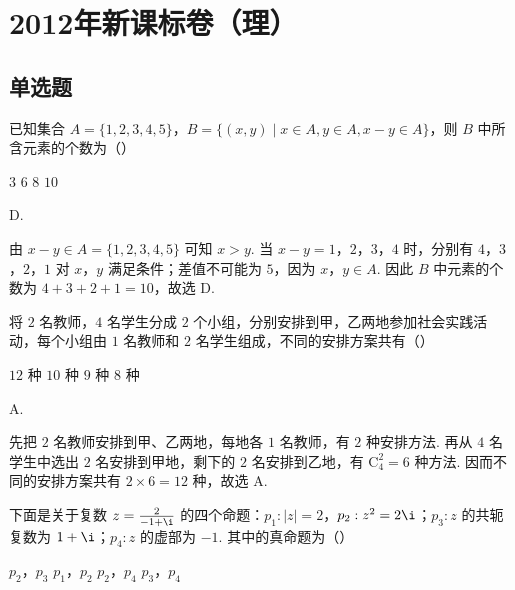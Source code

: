 \chapter{2012年新课标卷（理）}

\section{单选题}

\begin{problem}
已知集合 \(A = \{1, 2, 3, 4, 5\}\)，\(B = \{(x, y) \mid x \in A, y \in A, x - y \in A\}\)，则 \(B\) 中所含元素的个数为（\quad）

\choices
    {\(3\)}
    {\(6\)}
    {\(8\)}
    {\(10\)}
\end{problem}

\begin{answer}
D.
\end{answer}

\begin{solution}
由 \(x-y\in A=\{1,2,3,4,5\}\) 可知 \(x>y\). 当 \(x-y=1\)，\(2\)，\(3\)，\(4\) 时，分别有 \(4\)，\(3\)，\(2\)，\(1\) 对 \(x\)，\(y\) 满足条件；差值不可能为 \(5\)，因为 \(x\)，\(y\in A\). 因此 \(B\) 中元素的个数为 \(4+3+2+1=10\)，故选 D.
\end{solution}

\begin{problem}
将 \(2\) 名教师，\(4\) 名学生分成 \(2\) 个小组，分别安排到甲，乙两地参加社会实践活动，每个小组由 \(1\) 名教师和 \(2\) 名学生组成，不同的安排方案共有（\quad）

\choices
    {\(12\text{ 种}\)}
    {\(10\text{ 种}\)}
    {\(9\text{ 种}\)}
    {\(8\text{ 种}\)}
\end{problem}

\begin{answer}
A.
\end{answer}

\begin{solution}
先把 \(2\) 名教师安排到甲、乙两地，每地各 \(1\) 名教师，有 \(2\) 种安排方法. 再从 \(4\) 名学生中选出 \(2\) 名安排到甲地，剩下的 \(2\) 名安排到乙地，有 \(\mathrm C_4^2=6\) 种方法. 因而不同的安排方案共有 \(2\times6=12\) 种，故选 A.
\end{solution}

\begin{problem}
下面是关于复数 \(z = \frac{2}{-1 + \i}\) 的四个命题：\(p_1: |z| = 2\)，\(p_2: z^2 = 2\i\)；\(p_3: z\) 的共轭复数为 \(1 + \i\)；\(p_4: z\) 的虚部为 \(-1\). 其中的真命题为（\quad）

\choices
    {\(p_{2}\)，\(p_{3}\)}
    {\(p_{1}\)，\(p_{2}\)}
    {\(p_{2}\)，\(p_{4}\)}
    {\(p_{3}\)，\(p_{4}\)}
\end{problem}

